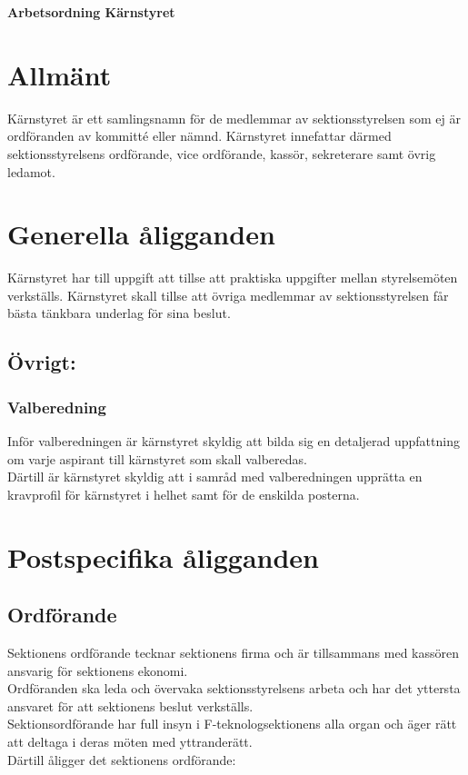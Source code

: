 

\renewcommand{\dateseparator}{-} %

\renewcommand{\forening}{Kärstyret }

\begin{center}
\LARGE{\textbf{Arbetsordning Kärnstyret}}
\end{center}



\section{Allmänt}
Kärnstyret är ett samlingsnamn för de medlemmar av sektionsstyrelsen som ej är ordföranden av kommitté eller nämnd. Kärnstyret innefattar därmed sektionsstyrelsens ordförande, vice ordförande, kassör, sekreterare samt övrig ledamot.

\section{Generella åligganden}
Kärnstyret har till uppgift att tillse att praktiska uppgifter mellan styrelsemöten verkställs. Kärnstyret skall tillse att övriga medlemmar av sektionsstyrelsen får bästa tänkbara underlag för sina beslut.

\subsection{Övrigt:}

\subsubsection{Valberedning}
Inför valberedningen är kärnstyret skyldig att bilda sig en detaljerad uppfattning om varje aspirant till kärnstyret som skall valberedas.\\
Därtill är kärnstyret skyldig att i samråd med valberedningen upprätta en kravprofil för kärnstyret i helhet samt för de enskilda posterna.



\section{Postspecifika åligganden}

\subsection{Ordförande}
Sektionens ordförande tecknar sektionens firma och är tillsammans med kassören ansvarig för sektionens ekonomi.\\
Ordföranden ska leda och övervaka sektionsstyrelsens arbeta och har det yttersta ansvaret för att sektionens beslut verkställs.\\
Sektionsordförande har full insyn i F-teknologsektionens alla organ och äger rätt att deltaga i deras möten med yttranderätt.\\
Därtill åligger det sektionens ordförande:

